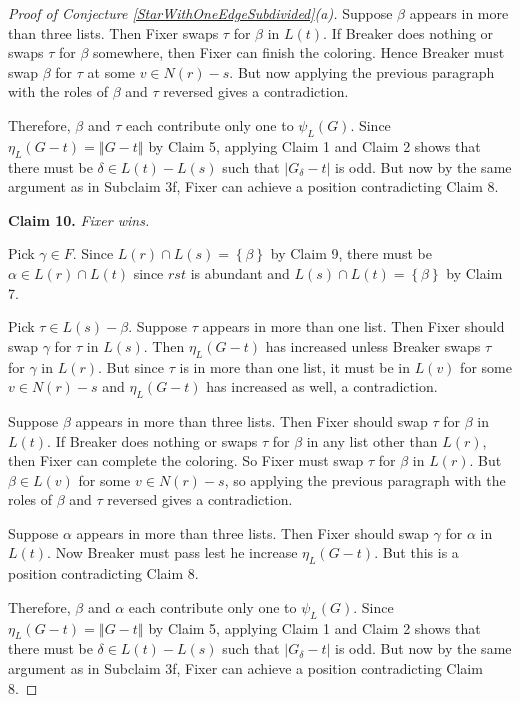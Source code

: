 \documentclass[12pt]{article}
\theoremstyle{plain}
\theoremstyle{definition}
\theoremstyle{remark}
\newcommand{\set}[1]{\left\{ #1 \right\}}
\newcommand{\card}[1]{\left|#1\right|}
\newcommand{\size}[1]{\left\Vert#1\right\Vert}
\begin{document}
\begin{proof} [Proof of Conjecture \ref{StarWithOneEdgeSubdivided}(a)]
	Suppose $\beta$ appears in more than three lists. Then Fixer swaps $\tau$ for $\beta$ in $L(t)$.  If Breaker does nothing or swaps $\tau$ for $\beta$ somewhere, then Fixer can finish the coloring.  Hence Breaker must swap $\beta$ for $\tau$ at some $v \in N(r) - s$.  But now applying the previous paragraph with the roles of $\beta$ and $\tau$ reversed gives a contradiction.
	
	Therefore, $\beta$ and $\tau$ each contribute only one to $\psi_L(G)$. Since $\eta_L(G-t) = \size{G-t}$ by Claim 5, applying Claim 1 and Claim 2 shows that there must be $\delta \in L(t) - L(s)$ such that $\card{G_\delta - t}$ is odd.  But now by the same argument as in Subclaim 3f, Fixer can achieve a position contradicting Claim 8.
	
	\noindent\textbf{Claim 10.  }\textit{Fixer wins.}
	
	Pick $\gamma \in F$.  Since $L(r) \cap L(s) = \set{\beta}$ by Claim 9, there must be $\alpha \in L(r) \cap L(t)$ since $rst$ is abundant and $L(s) \cap L(t) = \set{\beta}$ by Claim 7.
	
	Pick $\tau \in L(s) - \beta$.  Suppose $\tau$ appears in more than one list.  Then Fixer should swap $\gamma$ for $\tau$ in $L(s)$.  Then $\eta_L(G - t)$ has increased unless Breaker swaps $\tau$ for $\gamma$ in $L(r)$.  But since $\tau$ is in more than one list, it must be in $L(v)$ for some $v \in N(r) - s$ and $\eta_L(G - t)$ has increased as well, a contradiction.
	
	Suppose $\beta$ appears in more than three lists.  Then Fixer should swap $\tau$ for $\beta$ in $L(t)$.  If Breaker does nothing or swaps $\tau$ for $\beta$ in any list other than $L(r)$, then Fixer can complete the coloring.  So Fixer must swap $\tau$ for $\beta$ in $L(r)$.  But $\beta \in L(v)$ for some $v \in N(r) - s$, so applying the previous paragraph with the roles of $\beta$ and $\tau$ reversed gives a contradiction.
	
	Suppose $\alpha$ appears in more than three lists.  Then Fixer should swap $\gamma$ for $\alpha$ in $L(t)$. Now Breaker must pass lest he increase $\eta_L(G - t)$.  But this is a position contradicting Claim 8.
	
	Therefore, $\beta$ and $\alpha$ each contribute only one to $\psi_L(G)$. Since $\eta_L(G-t) = \size{G-t}$ by Claim 5, applying Claim 1 and Claim 2 shows that there must be $\delta \in L(t) - L(s)$ such that $\card{G_\delta - t}$ is odd.  But now by the same argument as in Subclaim 3f, Fixer can achieve a position contradicting Claim 8.
\end{proof}



\end{document}
